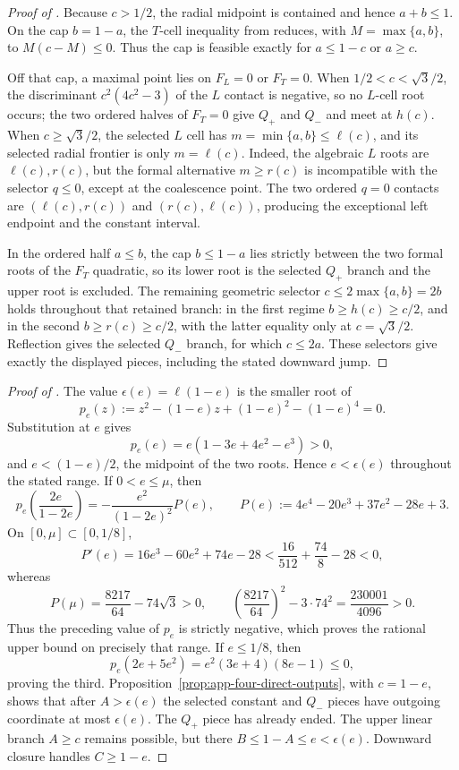 \begin{proof}[Proof of ]
Because $c>1/2$, the radial midpoint is contained and hence $a+b\le1$.  On
the cap $b=1-a$, the $T$-cell inequality from
 reduces, with
$M=\max\{a,b\}$, to $M(c-M)\le0$.  Thus the cap is feasible exactly for
$a\le1-c$ or $a\ge c$.

Off that cap, a maximal point lies on $F_L=0$ or $F_T=0$.  When
$1/2<c<\sqrt3/2$, the discriminant $c^2(4c^2-3)$ of the $L$ contact is
negative, so no $L$-cell root occurs; the two ordered halves of $F_T=0$ give
$Q_+$ and $Q_-$ and meet at $h(c)$.  When $c\ge\sqrt3/2$, the selected
$L$ cell has $m=\min\{a,b\}\le\ell(c)$, and its selected radial frontier is
only $m=\ell(c)$.  Indeed, the algebraic $L$ roots are
$\ell(c),r(c)$, but the formal alternative $m\ge r(c)$ is
incompatible with the selector $q\le0$, except at the coalescence point.
The two ordered $q=0$ contacts are
$(\ell(c),r(c))$ and $(r(c),\ell(c))$, producing the exceptional left
endpoint and the constant interval.

In the ordered half $a\le b$, the cap $b\le1-a$ lies strictly between the
two formal roots of the $F_T$ quadratic, so its lower root is the selected
$Q_+$ branch and the upper root is excluded.  The remaining geometric
selector $c\le2\max\{a,b\}=2b$ holds throughout that retained branch: in the
first regime $b\ge h(c)\ge c/2$, and in the second
$b\ge r(c)\ge c/2$, with the latter equality only at
$c=\sqrt3/2$.  Reflection gives the selected $Q_-$ branch, for which
$c\le2a$.  These selectors give exactly the displayed pieces, including the
stated downward jump.
\end{proof}

\begin{proof}[Proof of ]
The value $\epsilon(e)=\ell(1-e)$ is the smaller root of
\[
 p_e(z):=z^2-(1-e)z+(1-e)^2-(1-e)^4=0.
\]
Substitution at $e$ gives
\[
 p_e(e)=e(1-3e+4e^2-e^3)>0,
\]
and $e<(1-e)/2$, the midpoint of the two roots.  Hence
$e<\epsilon(e)$ throughout the stated range.  If $0<e\le\mu$, then
\[
 p_e\!\left(\frac{2e}{1-2e}\right)
 =-\frac{e^2}{(1-2e)^2}
 P(e),
 \qquad
 P(e):=4e^4-20e^3+37e^2-28e+3.
\]
On $[0,\mu]\subset[0,1/8]$,
\[
 P'(e)=16e^3-60e^2+74e-28
 <\frac{16}{512}+\frac{74}{8}-28<0,
\]
whereas
\[
 P(\mu)=\frac{8217}{64}-74\sqrt3>0,
 \qquad
 \left(\frac{8217}{64}\right)^2-3\cdot74^2
 =\frac{230001}{4096}>0.
\]
Thus the preceding value of $p_e$ is strictly negative,
which proves the rational upper bound on precisely that range.  If
$e\le1/8$, then
\[
 p_e(2e+5e^2)=e^2(3e+4)(8e-1)\le0,
\]
proving the third.  Proposition~\ref{prop:app-four-direct-outputs}, with
$c=1-e$, shows that after $A>\epsilon(e)$ the selected constant and $Q_-$
pieces have outgoing coordinate at most $\epsilon(e)$.  The $Q_+$ piece has
already ended.  The upper linear branch $A\ge c$ remains possible, but there
$B\le1-A\le e<\epsilon(e)$.  Downward closure handles $C\ge1-e$.
\end{proof}

